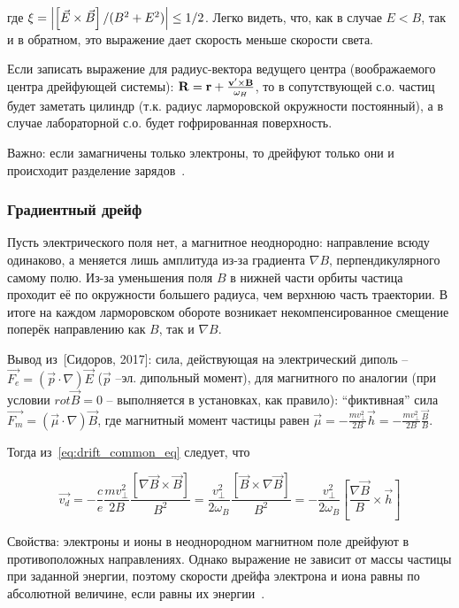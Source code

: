 \documentclass[10pt, a4paper]{article}
\newcommand{\Sidorov}{~[Сидоров, 2017]}
\begin{document}
где $\xi = \abs{\left[\vec{E} \times \vec{B}\right]/(B^2 + E^2)}\leq1/2$. Легко видеть, что, как в случае $E<B$, так и в обратном, это выражение дает 
скорость меньше скорости света.

Если записать выражение для радиус-вектора ведущего центра (воображаемого центра дрейфующей системы): $\vb{R}=\vb{r} + \frac{\vb{v}' \times \vb{B}}{\omega_H}$, то в сопутствующей с.о. частиц будет заметать цилиндр (т.к. радиус ларморовской окружности постоянный), а в случае лабораторной с.о. будет гофрированная поверхность.

Важно: если замагничены только электроны, то дрейфуют только они и происходит разделение зарядов~\cite{frank}.

\subsubsection{Градиентный дрейф}
\label{subsubsec:gr_drift}

Пусть электрического поля нет, а магнитное неоднородно: направление всюду одинаково, а меняется лишь амплитуда из-за градиента $\nabla B$, перпендикулярного самому полю. Из-за уменьшения поля $B$
в нижней части орбиты частица проходит её по окружности большего
радиуса, чем верхнюю часть траектории. В итоге на каждом ларморовском обороте возникает некомпенсированное смещение поперёк направлению как $B$, так и $\nabla B$.

Вывод из\Sidorov: сила, действующая на электрический диполь -- $\vec{F_e} = (\vec{p}\cdot\nabla)\vec{E}$ ($\vec{p}$ --эл. дипольный момент), для магнитного по аналогии (при условии $rot\vec{B}=0$ -- выполняется в установках, как правило): ``фиктивная'' сила~\cite{frank} $\vec{F_m} = (\vec{\mu}\cdot\nabla)\vec{B}$, где магнитный момент частицы равен $\vec{\mu}=-\frac{mv_\perp^2}{2B}\vec{h} = -\frac{mv_\perp^2}{2B}\frac{\vec{B}}{B}$.

Тогда из~\eqref{eq:drift_common_eq} следует, что

\begin{equation*}
	\overrightarrow{v_d} = -\frac{c}{e}\frac{mv_\perp^2}{2B}\frac{\left[\nabla \vec{B}\times\vec{B}\right]}{B^2}=\frac{v_\perp^2}{2\omega_{B}}\frac{\left[\vec{B}\times\nabla\vec{B}\right]}{B^2}=-\frac{v_\perp^2}{2\omega_{B}}\left[\frac{\nabla\vec{B}}{B}\times\vec{h}\right]
\end{equation*}

Свойства: электроны и ионы в неоднородном магнитном поле
дрейфуют в противоположных направлениях. Однако выражение не зависит от массы частицы при заданной энергии, поэтому скорости дрейфа электрона и иона равны по абсолютной величине,
если равны их энергии~\cite{kotelnikov}.
\end{document}
